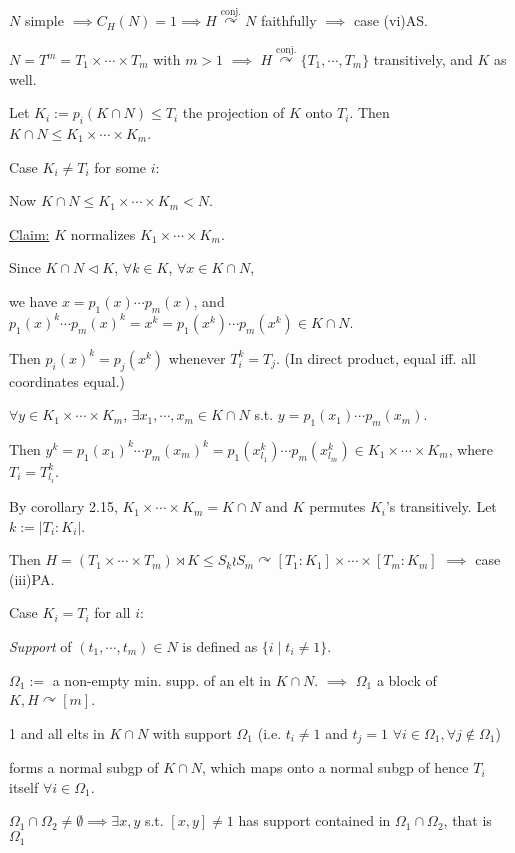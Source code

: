 \documentclass[a4paper,11pt]{article}
\begin{document}
$N$ simple $\implies C_H(N)=1\implies H\mathop{\curvearrowright}\limits^{\text{conj.}} N$ faithfully $\implies$ case (vi)AS.

$N=T^m=T_1\times\cdots\times T_m$ with $m>1$ $\implies$ $H\mathop{\curvearrowright}\limits^{\text{conj.}} \{T_1,\cdots,T_m\}$ transitively, and $K$ as well.

Let $K_i:=p_i(K\cap N)\leq T_i$ the projection of $K$ onto $T_i$. Then $K\cap N\leq K_1\times\cdots\times K_m$.



\noindent Case $K_i\neq T_i$ for some $i$: 

Now $K\cap N\leq K_1\times\cdots\times K_m < N$.

\underline{Claim:} $K$ normalizes $K_1\times\cdots\times K_m$. 

{\color{gray}
Since $K\cap N\triangleleft K$, $\forall k\in K$, $\forall x\in K\cap N$, 

we have $x=p_1(x)\cdots p_m(x)$, and $p_1(x)^k\cdots p_m(x)^k=x^k=p_1(x^k)\cdots p_m(x^k)\in K\cap N$. 

Then $p_i(x)^k=p_j(x^k)$ whenever $T_i^k=T_j$. (In direct product, equal iff. all coordinates equal.)

$\forall y \in K_1\times\cdots\times K_m$, $\exists x_1,\cdots, x_m\in K\cap N$ s.t. $y=p_1(x_1)\cdots p_m(x_m)$. 

Then $y^k=p_1(x_1)^k\cdots p_m(x_m)^k=p_1(x_{l_1}^k)\cdots p_m(x_{l_m}^k) \in K_1\times\cdots\times K_m$, where $T_i=T_{l_i}^k$.
}

By corollary 2.15, $K_1\times\cdots\times K_m=K\cap N$ and $K$ permutes $K_i$'s transitively. Let $k:=|T_i:K_i|$. 

Then $H=(T_1\times\cdots\times  T_m)\rtimes K\leq S_k\wr S_m\curvearrowright [T_1:K_1]\times\cdots\times[T_m:K_m]$ $\implies$ case (iii)PA.

\noindent Case $K_i= T_i$ for all $i$: 

\textit{Support} of $(t_1,\cdots,t_m)\in N$ is defined as $\{i\mid t_i\neq 1\}$.

$\Omega_1:=$ a non-empty min. supp. of an elt in $K\cap N$. $\implies$ $\Omega_1$ a block of $K,H\curvearrowright [m]$.

{\color{gray}
1 and all elts in $K\cap N$ with support $\Omega_1$ (i.e. $t_i\neq 1$ and $t_j=1$ $\forall i\in\Omega_1, \forall j\notin\Omega_1$) 

forms a normal subgp of $K\cap N$, which maps onto a normal subgp of hence $T_i$ itself $\forall i\in\Omega_1$.

$\Omega_1\cap \Omega_2\neq \emptyset\implies \exists x,y$ s.t. $[x,y]\neq 1$ has support contained in $\Omega_1\cap \Omega_2$, that is $\Omega_1$
}
\end{document}
